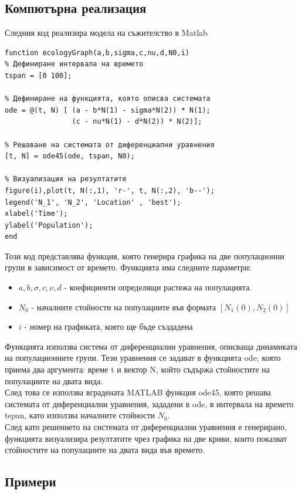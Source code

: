 \documentclass[a4paper,fleqn,12pt]{article}
\begin{document}
\subsection{Компютърна реализация}
Следния код реализира модела на съжителство в Matlab
\begin{verbatim}
function ecologyGraph(a,b,sigma,c,nu,d,N0,i)
% Дефиниране интервала на времето
tspan = [0 100];

% Дефиниране на функцията, която описва системата
ode = @(t, N) [ (a - b*N(1) - sigma*N(2)) * N(1);
                (c - nu*N(1) - d*N(2)) * N(2)];

% Решаване на системата от диференциални уравнения
[t, N] = ode45(ode, tspan, N0);

% Визуализация на резултатите
figure(i),plot(t, N(:,1), 'r-', t, N(:,2), 'b--');
legend('N_1', 'N_2', 'Location' , 'best');
xlabel('Time');
ylabel('Population');
end
\end{verbatim}
Този код представлява функция, която генерира графика на две популационни групи в зависимост от времето. 
Функцията има следните параметри:
\begin{itemize}    
	\item $a,b,\sigma, c, \nu, d$ - коефициенти определящи растежа на популацията. 
	\item $N_0$ - началните стойности на популациите във формата $[N_1(0), N_2(0)]$
	\item $i$ - номер на графиката, която ще бъде създадена
\end{itemize}
Функцията използва система от диференциални уравнения, описваща динамиката на популационните групи. 
Тези уравнения се задават в функцията ode, която приема два аргумента: време t и вектор N, който съдържа стойностите на популациите на двата вида.\\
След това се използва вградената MATLAB функция ode45, която решава системата от диференциални уравнения, зададени в ode, в интервала на времето tspan, като използва началните стойности $N_0$. \\
След като решението на системата от диференциални уравнения е генерирано, функцията визуализира резултатите чрез графика на две криви, които показват стойностите на популациите на двата вида във времето.  

\newpage
\subsection{Примери}
\end{document}
